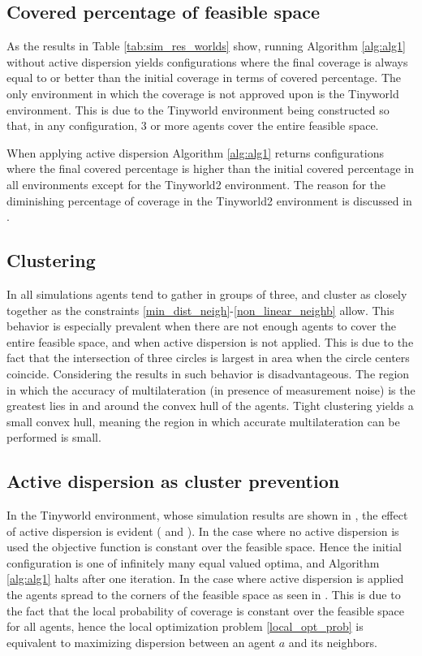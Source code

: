 \subsection{Covered percentage of feasible space}
As the results in Table \ref{tab:sim_res_worlds} show, running Algorithm \ref{alg:alg1} without active dispersion yields configurations where the 
final coverage is always equal to or better than the initial coverage in terms of covered percentage. The only environment in which the coverage is not approved upon is the Tinyworld environment.
This is due to the Tinyworld environment being constructed so that, in any configuration, 3 or more agents cover the entire feasible space.

When applying active dispersion Algorithm \ref{alg:alg1} returns configurations where the final covered percentage is higher than the initial covered percentage in all environments
except for the Tinyworld2 environment. The reason for the diminishing percentage of coverage in the Tinyworld2 environment is discussed in .

\subsection{Clustering}
In all simulations agents tend to gather in groups of three, and cluster as closely together as the constraints \eqref{min_dist_neigh}-\eqref{non_linear_neighb} allow.  
This behavior is especially prevalent when there are not enough agents to cover the entire feasible space, and when active dispersion is not applied. This is due to 
the fact that the intersection of three circles is largest in area when the circle centers coincide. Considering the results in \cite{CRB_multilat} such behavior is disadvantageous. The region in which
the accuracy of multilateration (in presence of measurement noise) is the greatest lies in and around the convex hull of the agents. Tight clustering yields a small convex hull, 
meaning the region in which accurate multilateration can be performed is small.


\subsection{Active dispersion as cluster prevention}
In the Tinyworld environment, whose simulation results are shown in , the effect of active dispersion is evident ( and ). 
In the case where no active dispersion is used the objective function is constant over the feasible space. Hence the initial configuration is one of 
infinitely many equal valued optima, and Algorithm \ref{alg:alg1} halts after one iteration. In the case where active dispersion is applied the agents spread to the corners of the
feasible space as seen in . This is due to the fact that the local probability of coverage is constant over the feasible space for all agents, hence the 
local optimization problem \eqref{local_opt_prob} is equivalent to maximizing dispersion between an agent $a$ and its neighbors. 

